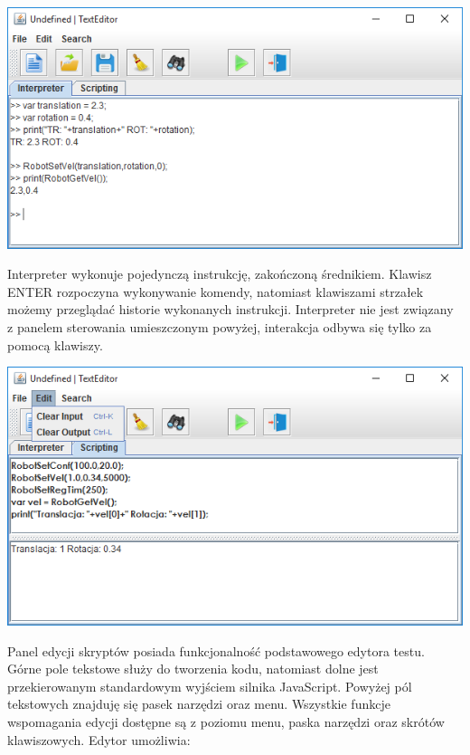 \documentclass[eng,printmode]{mgr}
\begin{document}
   \begin{center}
    \includegraphics[width=1\textwidth]{images/iterpreter1}
   \end{center}

Interpreter wykonuje pojedynczą instrukcję, zakończoną średnikiem. Klawisz ENTER rozpoczyna wykonywanie komendy, natomiast klawiszami strzałek możemy przeglądać historie wykonanych instrukcji. Interpreter nie jest związany z panelem sterowania umieszczonym powyżej, interakcja odbywa się tylko za pomocą klawiszy. 

   \begin{center}
    \includegraphics[width=1\textwidth]{images/skryptowanie}
   \end{center}

Panel edycji skryptów posiada funkcjonalność podstawowego edytora testu. Górne pole tekstowe służy do tworzenia kodu, natomiast dolne jest przekierowanym standardowym wyjściem silnika JavaScript. Powyżej pól tekstowych znajduję się pasek narzędzi oraz menu. Wszystkie funkcje wspomagania edycji dostępne są z poziomu menu, paska narzędzi oraz skrótów klawiszowych. Edytor umożliwia:
\end{document}
